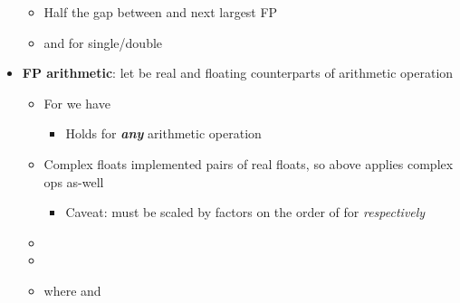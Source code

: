 \begin{itemize}
\begin{itemize}
  \item
    Half the gap between  and next largest FP
  \item
     and
     for single/double
  \end{itemize}
\item
  \textbf{FP arithmetic}: let \iMbox{\ast, \circledast} be real and
  floating counterparts of arithmetic operation

  \begin{itemize}
  
  \item
    For  we have

    \begin{itemize}
    
    \item
      Holds for \textbf{\emph{any}} arithmetic operation
      \iMbox{\circledast = \oplus, \ominus, \otimes, \oslash}
    \end{itemize}
  \item
    Complex floats implemented pairs of real floats, so above applies
    complex ops as-well

    \begin{itemize}
    
    \item
      Caveat: 
      must be scaled by factors on the order of 
      for \iMbox{\otimes, \oslash} \emph{respectively}
    \end{itemize}
  \item
  \item
  \item
    where
    and


\end{itemize}
\end{itemize}

